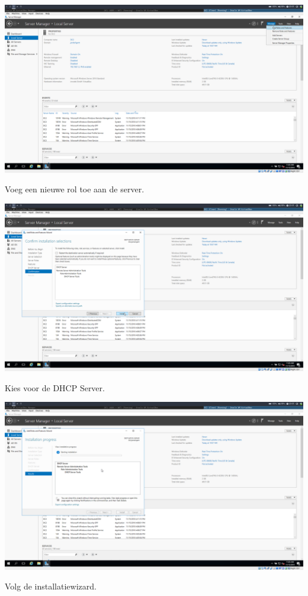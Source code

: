\documentclass[a4paper]{article}
\begin{document}
\begin{center}
	\includegraphics[width=15cm]{Pictures/DC2/DHCP/1542308705.png}
	
	Voeg een nieuwe rol toe aan de server.
\end{center}
\begin{center}
	\includegraphics[width=15cm]{Pictures/DC2/DHCP/1542308722.png}
	
	Kies voor de DHCP Server.
\end{center}
\begin{center}
	\includegraphics[width=15cm]{Pictures/DC2/DHCP/1542308725.png}
	
	Volg de installatiewizard.
\end{center}
\end{document}

